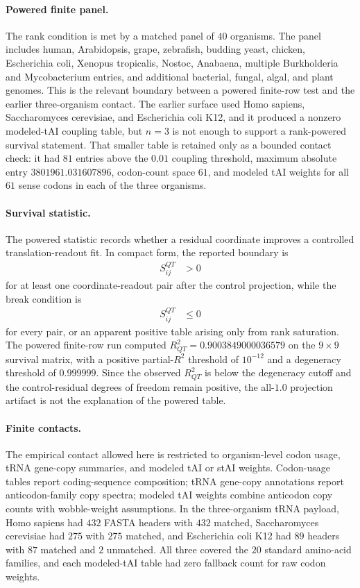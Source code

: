\paragraph{Powered finite panel.}
The rank condition is met by a matched panel of $40$ organisms. The panel includes human, Arabidopsis, grape, zebrafish, budding yeast, chicken, Escherichia coli, Xenopus tropicalis, Nostoc, Anabaena, multiple Burkholderia and Mycobacterium entries, and additional bacterial, fungal, algal, and plant genomes. This is the relevant boundary between a powered finite-row test and the earlier three-organism contact. The earlier surface used Homo sapiens, Saccharomyces cerevisiae, and Escherichia coli K12, and it produced a nonzero modeled-tAI coupling table, but $n=3$ is not enough to support a rank-powered survival statement. That smaller table is retained only as a bounded contact check: it had $81$ entries above the $0.01$ coupling threshold, maximum absolute entry $3801961.031607896$, codon-count space $61$, and modeled tAI weights for all $61$ sense codons in each of the three organisms.

\paragraph{Survival statistic.}
The powered statistic records whether a residual coordinate improves a controlled translation-readout fit. In compact form, the reported boundary is
$$
\begin{aligned}
S^{QT}_{ij} &> 0
\end{aligned}
$$
for at least one coordinate-readout pair after the control projection, while the break condition is
$$
\begin{aligned}
S^{QT}_{ij} &\leq 0
\end{aligned}
$$
for every pair, or an apparent positive table arising only from rank saturation. The powered finite-row run computed $R^2_{QT}=0.9003849000036579$ on the $9 \times 9$ survival matrix, with a positive partial-$R^2$ threshold of $10^{-12}$ and a degeneracy threshold of $0.999999$. Since the observed $R^2_{QT}$ is below the degeneracy cutoff and the control-residual degrees of freedom remain positive, the all-$1.0$ projection artifact is not the explanation of the powered table.

\paragraph{Finite contacts.}
The empirical contact allowed here is restricted to organism-level codon usage, tRNA gene-copy summaries, and modeled tAI or stAI weights. Codon-usage tables report coding-sequence composition; tRNA gene-copy annotations report anticodon-family copy spectra; modeled tAI weights combine anticodon copy counts with wobble-weight assumptions. In the three-organism tRNA payload, Homo sapiens had $432$ FASTA headers with $432$ matched, Saccharomyces cerevisiae had $275$ with $275$ matched, and Escherichia coli K12 had $89$ headers with $87$ matched and $2$ unmatched. All three covered the $20$ standard amino-acid families, and each modeled-tAI table had zero fallback count for raw codon weights.

